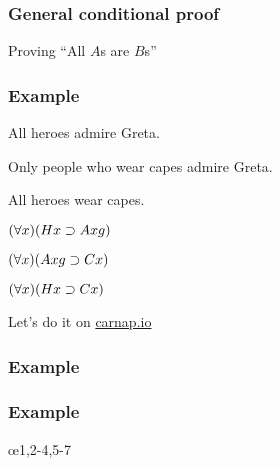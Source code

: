 \begin{frame}
\frametitle{General conditional proof}

Proving ``All $A$s are $B$s''

\begin{fitchproof}
  \open
  \close
\end{fitchproof}
\end{frame}

\begin{frame}
\frametitle{Example}

\begin{earg}
  \item[] All heroes admire Greta.
  \item[] Only people who wear capes admire Greta.
  \item[\therefore] All heroes wear capes.
\end{earg}

\bigskip

\begin{earg}
  \item[] $(\forall x)(Hx \supset Axg)$
  \item[] $(\forall x)(Axg \supset Cx)$
  \item[\therefore] $(\forall x)(Hx \supset Cx)$
\end{earg}

Let's do it on \href{https://carnap.io/shared/rzach@ucalgary.ca/Practice\%20Problems\%20VII.md}{carnap.io}
\end{frame}

\begin{frame}
\frametitle{Example}
\small
\begin{fitchproof}
  \open
  \close
\end{fitchproof}
\end{frame}

\begin{frame}
  \frametitle{Example}
  \small
  \begin{fitchproof}
    \open
\close
\open
{}
\close
  \oe{1,2-4,5-7}
  \end{fitchproof}
  \end{frame}

